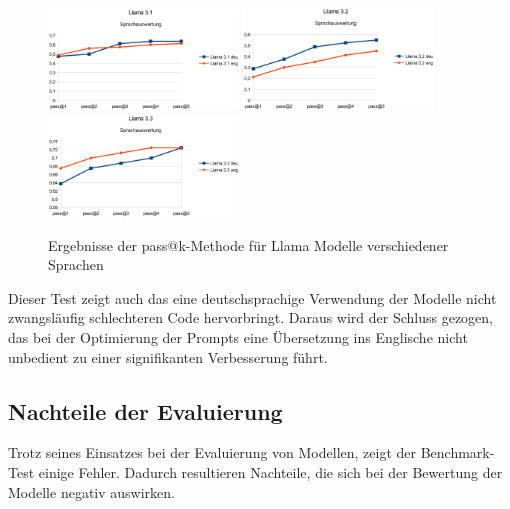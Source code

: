 \begin{figure}[!ht]
	\includegraphics[width=0.45\textwidth]{content/chapter_evaluation/images/llama31_evaluation_lang.eps}
	\includegraphics[width=0.45\textwidth]{content/chapter_evaluation/images/llama32_evaluation_lang.eps}
	\includegraphics[width=0.45\textwidth]{content/chapter_evaluation/images/llama33_evaluation_lang.eps}
	\caption{Ergebnisse der pass@k-Methode für Llama Modelle verschiedener Sprachen}
	\label{img:pass_at_k_results_by_llama_lang}
\end{figure}

Dieser Test zeigt auch das eine deutschsprachige Verwendung der Modelle nicht zwangsläufig schlechteren Code hervorbringt. Daraus wird der Schluss gezogen, das bei der Optimierung der Prompts eine Übersetzung ins Englische nicht unbedient zu einer signifikanten Verbesserung führt.

\subsection{Nachteile der Evaluierung}
Trotz seines Einsatzes bei der Evaluierung von Modellen, zeigt der Benchmark-Test einige Fehler. Dadurch resultieren Nachteile, die sich bei der Bewertung der Modelle negativ auswirken.\vspace{0.2cm}

